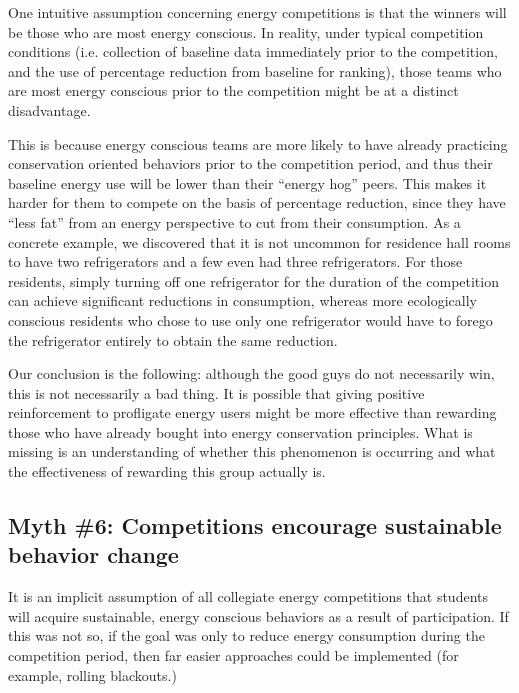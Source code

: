 \documentclass[jou]{apa} %
\begin{document}
One intuitive assumption concerning energy competitions is that the winners will be those
who are most energy conscious.  In reality, under typical competition conditions
(i.e. collection of baseline data immediately prior to the competition, and the use of
percentage reduction from baseline for ranking), those teams who are most energy conscious
prior to the competition might be at a distinct disadvantage.

This is because energy conscious teams are more likely to have already practicing 
conservation oriented behaviors prior to the competition period, and thus
their baseline energy use will be lower than their ``energy hog'' peers.  This makes it
harder for them to compete on the basis of percentage reduction, since they have ``less
fat'' from an energy perspective to cut from their consumption.  As a concrete example, we
discovered that it is not uncommon for residence hall rooms to have two refrigerators and
a few even had three refrigerators. For those residents, simply turning off one
refrigerator for the duration of the competition can achieve significant reductions in
consumption, whereas more ecologically conscious residents who chose to use only one
refrigerator would have to forego the refrigerator entirely to obtain the same reduction.

Our conclusion is the following: although the good guys do not necessarily win, this is
not necessarily a bad thing. It is possible that giving positive reinforcement to
profligate energy users might be more effective than rewarding those who have already
bought into energy conservation principles. What is missing is an understanding of whether
this phenomenon is occurring and what the effectiveness of rewarding this group actually is.


\subsection{Myth \#6: Competitions encourage sustainable behavior change}


It is an implicit assumption of all collegiate energy competitions that students will acquire
sustainable, energy conscious behaviors as a result of participation.  If this was not so,
if the goal was only to reduce energy consumption during the competition period, then far
easier approaches could be implemented (for example, rolling blackouts.)
\end{document}
